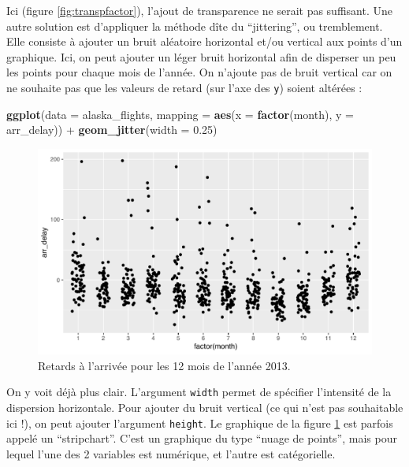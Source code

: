 \documentclass[
  a4paper,
]{article}
\newenvironment{Shaded}{\begin{snugshade}}{\end{snugshade}}
\newcommand{\DataTypeTok}[1]{\textcolor[rgb]{0.00,0.34,0.68}{#1}}
\newcommand{\FloatTok}[1]{\textcolor[rgb]{0.69,0.50,0.00}{#1}}
\newcommand{\KeywordTok}[1]{\textcolor[rgb]{0.12,0.11,0.11}{\textbf{#1}}}
\newcommand{\NormalTok}[1]{\textcolor[rgb]{0.12,0.11,0.11}{#1}}
\newcommand{\OperatorTok}[1]{\textcolor[rgb]{0.12,0.11,0.11}{#1}}
\newcommand{\StringTok}[1]{\textcolor[rgb]{0.75,0.01,0.01}{#1}}
\begin{document}
Ici (figure \ref{fig:transpfactor}), l'ajout de transparence ne serait pas suffisant. Une autre solution est d'appliquer la méthode dîte du ``jittering'', ou tremblement. Elle consiste à ajouter un bruit aléatoire horizontal et/ou vertical aux points d'un graphique. Ici, on peut ajouter un léger bruit horizontal afin de disperser un peu les points pour chaque mois de l'année. On n'ajoute pas de bruit vertical car on ne souhaite pas que les valeurs de retard (sur l'axe des \texttt{y}) soient altérées :

\begin{Shaded}
\begin{Highlighting}[]
\KeywordTok{ggplot}\NormalTok{(}\DataTypeTok{data =}\NormalTok{ alaska_flights, }
       \DataTypeTok{mapping =} \KeywordTok{aes}\NormalTok{(}\DataTypeTok{x =} \KeywordTok{factor}\NormalTok{(month), }\DataTypeTok{y =}\NormalTok{ arr_delay)) }\OperatorTok{+}
\StringTok{  }\KeywordTok{geom_jitter}\NormalTok{(}\DataTypeTok{width =} \FloatTok{0.25}\NormalTok{)}
\end{Highlighting}
\end{Shaded}

\begin{figure}[htpb]

{\centering \includegraphics[width=0.9\linewidth]{figure/jittering-1} 

}

\caption{Retards à l'arrivée pour les 12 mois de l'année 2013.}\label{fig:jittering}
\end{figure}

On y voit déjà plus clair. L'argument \texttt{width} permet de spécifier l'intensité de la dispersion horizontale. Pour ajouter du bruit vertical (ce qui n'est pas souhaitable ici !), on peut ajouter l'argument \texttt{height}. Le graphique de la figure \ref{fig:jittering} est parfois appelé un ``stripchart''. C'est un graphique du type ``nuage de points'', mais pour lequel l'une des 2 variables est numérique, et l'autre est catégorielle.
\end{document}
